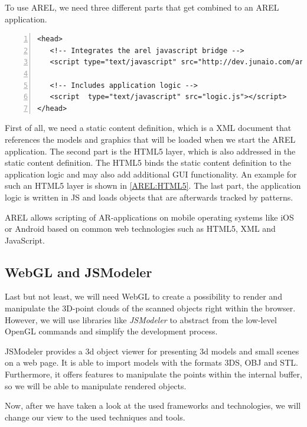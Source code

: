 To use \ac{AREL}, we need three different parts that get combined to an \ac{AREL} application.

\begin{lstlisting}[numbers=left,caption={Example for the HTML5 AREL layer},label=AREL:HTML5,frame=tlbr,breaklines]
<head>
   <!-- Integrates the arel javascript bridge -->
   <script type="text/javascript" src="http://dev.junaio.com/arel/js/arel.js"></script>

   <!-- Includes application logic -->
   <script  type="text/javascript" src="logic.js"></script>
</head>
\end{lstlisting}

First of all, we need a static content definition, which is a \ac{XML} document that references the models and graphics that will be loaded when we start the \ac{AREL} application. The second part is the \ac{HTML5} layer, which is also addressed in the static content definition. The \ac{HTML5} binds the static content definition to the application logic and may also add additional \ac{GUI} functionality. An example for such an \ac{HTML5} layer is shown in \ref{AREL:HTML5}. The last part, the application logic is written in \ac{JS} and loads objects that are afterwards tracked by patterns.  

\ac{AREL} allows scripting of \ac{AR}-applications on mobile operating systems like iOS or Android based on common web technologies such as \ac{HTML5}, \ac{XML} and JavaScript. 

\subsection{WebGL and JSModeler}
Last but not least, we will need \ac{WebGL} to create a possibility to render and manipulate the 3D-point clouds of the scanned objects right within the browser. However, we will use libraries like \emph{JSModeler} to abstract from the low-level OpenGL commands and simplify the development process.

JSModeler provides a 3d object viewer for presenting 3d models and small scenes on a web page. It is able to import models with the formats 3DS, OBJ and STL. Furthermore, it offers features to manipulate the points within the internal buffer, so we will be able to manipulate rendered objects. 

Now, after we have taken a look at the used frameworks and technologies, we will change our view to the used techniques and tools.

